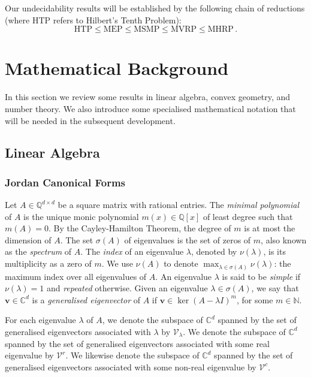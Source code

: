\documentclass[format=acmsmall, review=false, screen=true]{acmart}
\newcommand{\Complex}{\mathbb{C}}
\newcommand{\Rationals}{\mathbb{Q}}
\newcommand{\Naturals}{\mathbb{N}}
\newcommand{\myvector}{\boldsymbol}
\begin{document}
Our undecidability results will be established by the following chain
of reductions (where HTP refers to Hilbert's Tenth Problem):
\begin{equation*}
\mbox{HTP} \leq \mbox{MEP} \leq \mbox{MSMP} \leq \mbox{MVRP} \leq \mbox{MHRP} \, .
\end{equation*}

\section{Mathematical Background}
\label{ch:background}
In this section we review some results in linear algebra, 
convex geometry, and number
theory.  We also introduce some specialised mathematical
notation that will be needed in the subsequent development.

\subsection{Linear Algebra}

\subsubsection{Jordan Canonical Forms}
\label{sec:jordan}

Let $A \in \Rationals^{d \times d}$ be a square matrix with rational
entries.
The \emph{minimal polynomial} of $A$ is the unique monic
polynomial $m(x) \in \Rationals[x]$ of least degree such that
$m(A)=0$.  By the Cayley-Hamilton Theorem, the degree of $m$ is at most
the dimension of $A$. The set $\sigma(A)$ of eigenvalues is the set of
zeros of $m$, also known as the \emph{spectrum} of $A$.
The \emph{index} of an eigenvalue $\lambda$, denoted
by $\nu(\lambda)$, is its multiplicity as a zero of $m$. We
use $\nu(A)$ to denote $\max_{\lambda\in\sigma(A)} \nu(\lambda)$: the
maximum index over all eigenvalues of $A$. An eigenvalue $\lambda$ is said to be \emph{simple} if $\nu(\lambda) = 1$ and \emph{repeated} otherwise.
Given an eigenvalue $\lambda \in \sigma(A)$, we say that $\myvector{v} \in \Complex^{d}$ is a \emph{generalised eigenvector} of $A$ if $\myvector{v}\in \ker{(A-\lambda I)}^{m}$, for some $m\in\Naturals$.

For each eigenvalue $\lambda$ of $A$, we denote the subspace of
$\Complex^{d}$ spanned by the set of generalised eigenvectors
associated with $\lambda$ by $\mathcal{V}_{\lambda}$. We denote the
subspace of $\Complex^{d}$ spanned by the set of generalised
eigenvectors associated with some real eigenvalue by
$\mathcal{V}^{r}$.  We likewise denote the subspace of $\Complex^{d}$
spanned by the set of generalised eigenvectors associated with some
non-real eigenvalue by $\mathcal{V}^{c}$.
\end{document}
